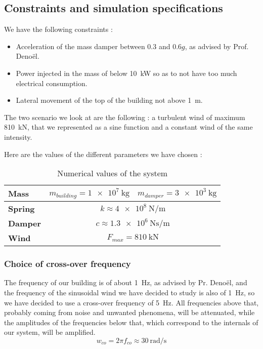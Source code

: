 \subsection{Constraints and simulation specifications}
We have the following constraints : 
\begin{itemize}
    \item Acceleration of the mass damper between \num{0.3} and \num{0.6}$g$, as advised by Prof. Denoël.
    \item Power injected in the mass of below \SI{10}{\kilo\watt} so as to not have too much electrical consumption.
    \item Lateral movement of the top of the building not above \SI{1}{\meter}.
\end{itemize}
The two scenario we look at are the following : a turbulent wind of maximum \SI{810}{\kilo\newton}, that we represented as a sine function and a constant wind of the same intensity.\par
Here are the values of the different parameters we have chosen : 
\begin{table}[H]
    \centering
    \begin{tabular}{|l|c|c|}
        \hline
        {\bf Mass} & $m_{building} = \SI{1e7}{\kilogram}$ & $m_{damper} = \SI{3e3}{\kilogram}$\\ \hline
        {\bf Spring} & \multicolumn{2}{c|}{$k\approx\SI{4e8}{\newton\per\meter}$}\\ \hline
        {\bf Damper} & \multicolumn{2}{c|}{$c\approx\SI{1.3e6}{\newton\second\per\meter}$}\\ \hline
        {\bf Wind} & \multicolumn{2}{c|}{$F_{max} = \SI{810}{\kilo\newton}$}\\ \hline
    \end{tabular}
    \caption{Numerical values of the system}
    \label{tab:numerical-values}
\end{table}

\subsubsection{Choice of cross-over frequency}
The frequency of our building is of about \SI{1}{\hertz}, as advised by Pr. Denoël, and the frequency of the sinusoidal wind we have decided to study is also of \SI{1}{\hertz}, so we have decided to use a cross-over frequency of \SI{5}{\hertz}. All frequencies above that, probably coming from noise and unwanted phenomena, will be attenuated, while the amplitudes of the frequencies below that, which correspond to the internals of our system, will be amplified.
$$
w_{co} = 2\pi f_{co} \approx \SI{30}{\radian\per\second}
$$
